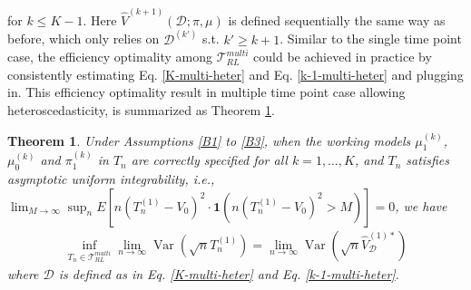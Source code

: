 \documentclass[11pt]{article}
\theoremstyle{referenceplain}
\newtheorem{theorem}{Theorem}
\theoremstyle{referencedefinition}
\theoremstyle{referenceremark}
\begin{document}
for $k\leq K-1$. Here $\widehat{V}^{(k+1)}(\mathcal{D};\pi,\mu)$ is defined sequentially the same way as before, which only relies on $\mathcal{D}^{(k')}$ s.t. $k'\ge k+1$. Similar to the single time point case, the efficiency optimality among $\mathcal{T}_{RL}^{multi}$ could be achieved in practice by consistently estimating Eq. \eqref{K-multi-heter} and  Eq. \eqref{k-1-multi-heter} and plugging in. This efficiency optimality result in multiple time point case allowing heteroscedasticity, is summarized as Theorem \ref{multi-heter-eff-opt}.
\begin{theorem}\label{multi-heter-eff-opt}
     Under Assumptions \ref{B1} to \ref{B3}, when the working models 
     $\mu_1^{(k)}$, $\mu_0^{(k)}$ and $\pi_1^{(k)}$ in $T_n$ are 
     correctly specified for all $k=1,\dots,K$, and $T_n$ satisfies 
     asymptotic uniform integrability, i.e., 
     $\lim_{M \rightarrow \infty} \sup_n 
     E\left[n\left(T_n^{(1)}-V_0\right)^2 \cdot 
     \mathbf{1}\left(n\left(T_n^{(1)}-V_0\right)^2>M\right)
     \right]=0$, we have
    \begin{align*}
        \inf_{T_n\in\mathcal{T}_{RL}^{multi}}
        \lim_{n\to\infty}\operatorname{Var}(\sqrt{n}T_n^{(1)})
        = \lim_{n\to\infty}\operatorname{Var}
        (\sqrt{n}\widehat{V}_{\mathcal{D}}^{(1)*})
    \end{align*}
    where $\mathcal{D}$ is defined as in Eq. \eqref{K-multi-heter} 
    and Eq. \eqref{k-1-multi-heter}.
\end{theorem}
\end{document}
